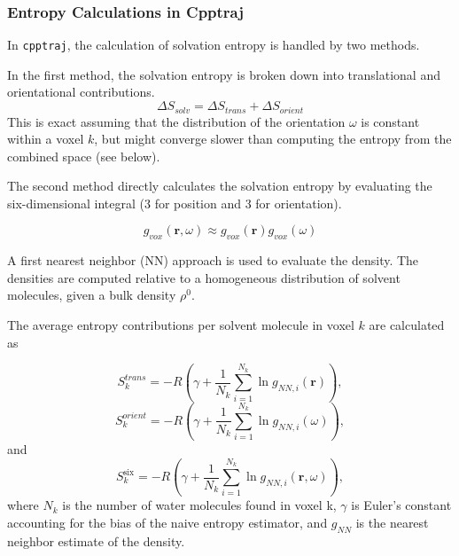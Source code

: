 \documentclass[9pt,tutorial]{livecoms}
\newcommand{\software}{\texttt}
\begin{document}
\subsubsection{Entropy Calculations in Cpptraj}
In \software{cpptraj}, the calculation of solvation entropy is handled by two methods.

In the first method, the solvation entropy is broken down into translational and orientational contributions.
\begin{equation}
\Delta S_\textit{solv} = \Delta S_\textit{trans} + \Delta S_\textit{orient}
\end{equation}
This is exact assuming that the distribution of the orientation $\omega$ is constant within a voxel $k$, but might converge slower than computing the entropy from the combined space (see below).

The second method directly calculates the solvation entropy by evaluating the six-dimensional integral (3 for position and 3 for orientation).

\begin{equation}
g_\textit{vox} \left( \textbf{r}, \omega \right) \approx g_\textit{vox}(\textbf{r}) g_\textit{vox}(\omega)
\end{equation}

A first nearest neighbor (NN) approach is used to evaluate the density.
The densities are computed relative to a homogeneous distribution of solvent molecules, given a bulk density $\rho^0$.

The average entropy contributions per solvent molecule in voxel $k$ are calculated as

\begin{equation}
	S_{k}^\textit{trans} = -R \left( \gamma + \frac{1}{N_\textit{k}} \sum _{i=1}^{N_k} \ln g_{NN, \textit{i}}(\textbf{r}) \right),
\end{equation}
\begin{equation}
S_{k}^\textit{orient} = -R \left( \gamma + \frac{1}{N_k} \sum _{i=1}^{N_k} \ln g_{NN, i}(\omega) \right)
,
\end{equation}
and
\begin{equation}
S_\textit{k}^\text{six} = -R \left( \gamma + \frac{1}{N_\textit{k}} \sum _{i=1}^{N_k} \ln g_{NN, \textit{i}}(\textbf{r},\omega) \right),
\end{equation}
where $N_\textit{k}$ is the number of water molecules found in voxel k, $\gamma$ is Euler's constant accounting for the bias of the naive entropy estimator, and $g_\textit{NN}$ is the nearest neighbor estimate of the density.
\end{document}
